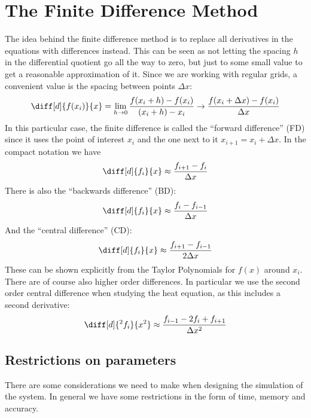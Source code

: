 \documentclass[sigconf]{acmart}
\begin{document}
\section{The Finite Difference Method}
The idea behind the finite difference method is to replace all derivatives in the equations with differences instead. This can be seen as not letting the spacing $ h $ in the differential quotient go all the way to zero, but just to some small value to get a reasonable approximation of it. Since we are working with regular grids, a convenient value is the spacing between points $ \Delta x $:
\begin{equation}\label{key}
	\diff[d]{f(x_i)}{x} = \lim\limits_{h\to 0} \frac{f(x_i + h) - f(x_i)}{(x_i+h) - x_i} \to \frac{f(x_i + \Delta x) - f(x_i)}{\Delta x}
\end{equation}
In this particular case, the finite difference is called the ``forward difference'' (FD) since it uses the point of interest $ x_i $ and the one next to it $ x_{i+1} = x_i + \Delta x $. In the compact notation we have
\begin{equation}\label{key}
	\diff[d]{f_i}{x} \approx \frac{f_{i+1} - f_{i}}{\Delta x}
\end{equation}
There is also the ``backwards difference'' (BD):
\begin{equation}\label{key}
	\diff[d]{f_i}{x} \approx \frac{f_{i} - f_{i-1}}{\Delta x}
\end{equation}
And the ``central difference'' (CD):
\begin{equation}\label{key}
	\diff[d]{f_i}{x} \approx \frac{f_{i+1} - f_{i-1}}{2 \Delta x}
\end{equation}
These can be shown explicitly from the Taylor Polynomials for $ f(x) $ around $ x_i $. There are of course also higher order differences. In particular we use the second order central difference when studying the heat equation, as this includes a second derivative:
\begin{equation}\label{key}
	\diff[d]{^2 f_i}{x^2} \approx \frac{f_{i-1} - 2f_i + f_{i+1}}{\Delta x^2}
\end{equation}

\subsection{Restrictions on parameters}
There are some considerations we need to make when designing the simulation of the system. In general we have some restrictions in the form of time, memory and accuracy.
\end{document}
